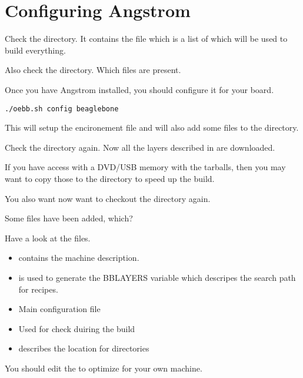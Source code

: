 \section{Configuring Angstrom}

Check the  directory. It contains the  file which is a
list of  which will be used to build everything.

Also check the  directory. Which files are present.

Once you have Angstrom installed, you should configure it for your board.

\begin{verbatim}
./oebb.sh config beaglebone
\end{verbatim}

This will setup the encironement file 
and will also add some files to the  directory.

Check the  directory again. Now all the layers described in 
are downloaded.

If you have access with a DVD/USB memory with the tarballs, then you may
want to copy those to the  directory to speed up the build.

You also want now want to checkout the  directory again.

Some files have been added, which?

Have a look at the files. 

\begin{itemize}
\item {} contains the machine description.

\item {} is used to generate the BBLAYERS variable
   which descripes the search path for recipes.

\item {} Main configuration file

\item {} Used for check duiring the build

\item {} describes the location for  directories

\end{itemize}

You should edit the  to optimize for your own machine.

